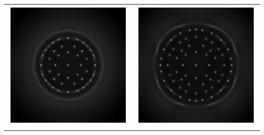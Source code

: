 \documentclass[compress,12pt]{beamer}
\begin{document}
\begin{frame}
{\begin{center}
\begin{tabular}{cc}
	  \includegraphics[height=.4\textheight]{figures/ecoli0022} &
	  \includegraphics[height=.4\textheight]{figures/ecoli0028} \\
	\end{tabular}

\end{center}}
\end{frame}
\end{document}
